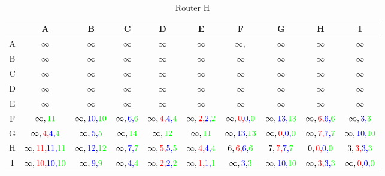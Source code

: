 \documentclass[a4paper,10pt]{article}
\begin{document}
\begin{table}[H]
\centering
\begin{tabular}{|c|c|c|c|c|c|c|c|c|c|} \hline
 & A & B & C & D & E & F & G & H & I  \\\hline
A & $ \infty $ & $\infty $ & $ \infty$ & $\infty $ & $ \infty$ & $\infty,$ & $ \infty$ & $ \infty$ & $ \infty$ \\\hline
B & $ \infty$ & $\infty $ & $ \infty$ & $\infty $ & $ \infty$ & $\infty $ & $ \infty$ & $ \infty$ & $ \infty$ \\\hline
C & $ \infty$ & $\infty $ & $ \infty$ & $\infty $ & $ \infty$ & $\infty $ & $ \infty$ & $ \infty$ & $ \infty$ \\\hline
D & $ \infty$ & $\infty $ & $ \infty$ & $\infty $ & $ \infty$ & $\infty $ & $ \infty$ & $ \infty$ & $ \infty$ \\\hline
E & $ \infty$ & $\infty $ & $ \infty$ & $\infty $ & $ \infty$ & $\infty $ & $ \infty$ & $ \infty$ & $ \infty$ \\\hline
F & $ \infty,{\color{green}11}$ & $\infty,{\color{blue}10,}{\color{green}10} $ & $ \infty,{\color{blue}6,}{\color{green}6}$ & $\infty,{\color{red}4,}{\color{blue}4,}{\color{green}4} $ & $ \infty,{\color{red}2,}{\color{blue}2,}{\color{green}2}$ & $\infty,{\color{red}0,}{\color{blue}0,}{\color{green}0} $ & $ \infty,{\color{blue}13,}{\color{green}13}$ & $ \infty,{\color{red}6,}{\color{blue}6,}{\color{green}6}$ & $ \infty,{\color{blue}3,}{\color{green}3}$ \\\hline
G & $ \infty,{\color{red}4,}{\color{blue}4,}{\color{green}4}$ & $\infty,{\color{blue}5,}{\color{green}5} $ & $ \infty,{\color{green}14}$ & $\infty,{\color{green}12} $ & $ \infty,{\color{green}11}$ & $\infty,{\color{blue}13,}{\color{green}13} $ & $ \infty,{\color{red}0,}{\color{blue}0,}{\color{green}0}$ & $ \infty,{\color{red}7,}{\color{blue}7,}{\color{green}7}$ & $ \infty,{\color{blue}10,}{\color{green}10}$ \\\hline
H & $ \infty,{\color{red}11,}{\color{blue}11,}{\color{green}11}$ & $\infty,{\color{blue}12,}{\color{green}12} $ & $ \infty,{\color{blue}7,}{\color{green}7}$ & $\infty,{\color{red}5,}{\color{blue}5,}{\color{green}5} $ & $ \infty,{\color{red}4,}{\color{blue}4,}{\color{green}4}$ & $6,{\color{red}6,}{\color{blue}6,}{\color{green}6} $ & $7,{\color{red}7,}{\color{blue}7,}{\color{green}7} $ & $0,{\color{red}0,}{\color{blue}0,}{\color{green}0} $ & $3,{\color{red}3,}{\color{blue}3,}{\color{green}3}$ \\\hline
I & $ \infty,{\color{red}10,}{\color{blue}10,}{\color{green}10}$ & $ \infty,{\color{blue}9,}{\color{green}9}$ & $ \infty,{\color{blue}4,}{\color{green}4}$ & $ \infty,{\color{red}2,}{\color{blue}2,}{\color{green}2}$ & $ \infty,{\color{red}1,}{\color{blue}1,}{\color{green}1}$ & $ \infty,{\color{blue}3,}{\color{green}3}$ & $ \infty,{\color{blue}10,}{\color{green}10}$ & $ \infty,{\color{red}3,}{\color{blue}3,}{\color{green}3}$ & $ \infty,{\color{red}0,}{\color{blue}0,}{\color{green}0}$ \\\hline
\end{tabular}
\caption{Router H}
\end{table} \\
\end{document}
